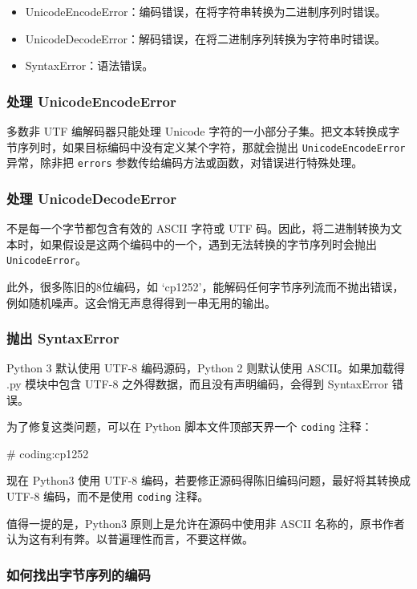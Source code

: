 \begin{itemize}
    \item UnicodeEncodeError：编码错误，在将字符串转换为二进制序列时错误。
    \item UnicodeDecodeError：解码错误，在将二进制序列转换为字符串时错误。
    \item SyntaxError：语法错误。
\end{itemize}

\subsubsection{处理 UnicodeEncodeError}

多数非 UTF 编解码器只能处理 Unicode 字符的一小部分子集。把文本转换成字节序列时，如果目标编码中没有定义某个字符，那就会抛出 \texttt{UnicodeEncodeError} 异常，除非把 \texttt{errors} 参数传给编码方法或函数，对错误进行特殊处理。

\subsubsection{处理 UnicodeDecodeError}

不是每一个字节都包含有效的 ASCII 字符或 UTF 码。因此，将二进制转换为文本时，如果假设是这两个编码中的一个，遇到无法转换的字节序列时会抛出 \texttt{UnicodeError}。

此外，很多陈旧的8位编码，如 `cp1252'，能解码任何字节序列流而不抛出错误，例如随机噪声。这会悄无声息得得到一串无用的输出。

\subsubsection{抛出 SyntaxError}

Python 3 默认使用 UTF-8 编码源码，Python 2 则默认使用 ASCII。如果加载得 .py 模块中包含 UTF-8 之外得数据，而且没有声明编码，会得到 SyntaxError 错误。

为了修复这类问题，可以在 Python 脚本文件顶部天界一个 \texttt{coding} 注释：

\begin{python}
# coding:cp1252
\end{python}

现在 Python3 使用 UTF-8 编码，若要修正源码得陈旧编码问题，最好将其转换成 UTF-8 编码，而不是使用 \texttt{coding} 注释。

值得一提的是，Python3 原则上是允许在源码中使用非 ASCII 名称的，原书作者认为这有利有弊。以普遍理性而言，不要这样做。

\subsubsection{如何找出字节序列的编码}


